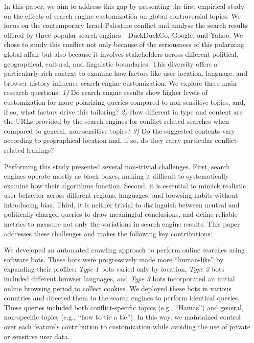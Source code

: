 In this paper, we aim to address this gap by presenting the first empirical study on the effects of search engine customization on global controversial topics. We focus on the contemporary Israel-Palestine conflict and analyse the search results offered by three popular search engines---DuckDuckGo, Google, and Yahoo. We chose to study this conflict not only because of the seriousness of this polarizing global affair but also because it involves stakeholders across different political, geographical, cultural, and linguistic boundaries. This diversity offers a particularly rich context to examine how factors like user location, language, and browser history influence search engine customization. We explore three main research questions: \textit{1)} Do search engine results show higher levels of customization for more polarizing queries compared to non-sensitive topics, and, if so, what factors drive this tailoring? \textit{2)} How different in type and content are the URLs provided by the search engines for conflict-related searches when compared to general, non-sensitive topics? \textit{3)} Do the suggested contents vary according to geographical location and, if so, do they carry particular conflict-related leanings?


Performing this study presented several non-trivial challenges. First, search engines operate mostly as black boxes, making it difficult to systematically examine how their algorithms function. Second, it is essential to mimick realistic user behavior across different regions, languages, and browsing habits without introducing bias. Third, it is neither trivial to distinguish between neutral and politically charged queries to draw meaningful conclusions, and define reliable metrics to measure not only the variations in search engine results. This paper addresses these challenges and makes the following key contributions:

 We developed an automated crawling approach to perform online searches using software bots. These bots were progressively made more ``human-like'' by expanding their profiles: \textit{Type 1} bots varied only by location, \textit{Type 2} bots included different browser languages, and \textit{Type 3} bots incorporated an initial online browsing period to collect cookies. We deployed these bots in various countries and directed them to the search engines to perform identical queries. These queries included both conflict-specific topics (e.g., ``Hamas'') and general, non-specific topics (e.g., ``how to tie a tie''). In this way, we maintained control over each feature's contribution to customization while avoiding the use of private or sensitive user data.

